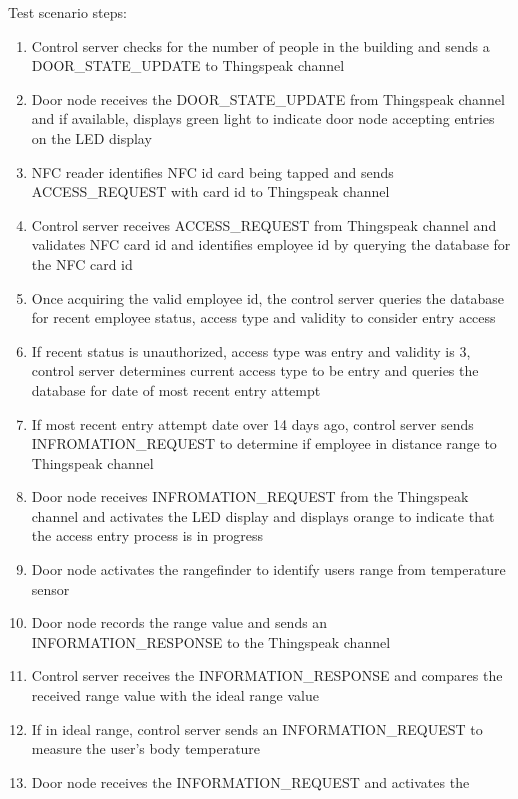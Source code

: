 \noindent
Test scenario steps:
\begin{enumerate}
    \item Control server checks for the number of people in the building and
          sends a DOOR\_STATE\_UPDATE to Thingspeak channel
    \item Door node receives the DOOR\_STATE\_UPDATE from Thingspeak channel and
          if available, displays green light to indicate door node accepting
          entries on the LED display
    \item NFC reader identifies NFC id card being tapped and sends
          ACCESS\_REQUEST with card id to Thingspeak channel
    \item Control server receives ACCESS\_REQUEST from Thingspeak channel and
          validates NFC card id and identifies employee id by querying the
          database for the NFC card id 
    \item Once acquiring the valid employee id, the control server queries the
          database for recent employee status, access type and validity to
          consider entry access
    \item If recent status is unauthorized, access type was entry and validity
          is 3, control server determines current access type to be entry and
          queries the database for date of most recent entry attempt
    \item If most recent entry attempt date over 14 days ago, control server
          sends INFROMATION\_REQUEST to determine if employee in distance range
          to Thingspeak channel
    \item Door node receives INFROMATION\_REQUEST from the Thingspeak channel
          and activates the LED display and displays orange to indicate that the
          access entry process is in progress 
    \item Door node activates the rangefinder to identify users range from
          temperature sensor
    \item Door node records the range value and sends an INFORMATION\_RESPONSE 
          to the Thingspeak channel
    \item Control server receives the INFORMATION\_RESPONSE and compares the
          received range value with the ideal range value
    \item If in ideal range, control server sends an INFORMATION\_REQUEST to
          measure the user’s body temperature
    \item Door node receives the INFORMATION\_REQUEST and activates the

\end{enumerate}
